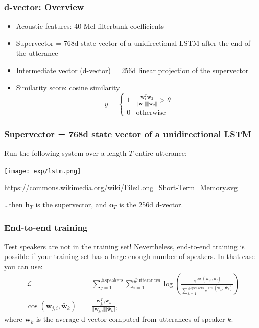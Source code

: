 \documentclass{beamer}
\begin{document}
\begin{frame}
  \frametitle{d-vector: Overview}

  \begin{itemize}
  \item Acoustic features: 40 Mel filterbank coefficients
  \item Supervector = 768d state vector of a unidirectional LSTM after the end of the utterance
  \item Intermediate vector (d-vector) = 256d linear projection of the supervector
  \item Similarity score: cosine similarity
    \begin{displaymath}
      y=\begin{cases}
      1 & \frac{\bm{w}_1^T\bm{w}_2}{\Vert\bm{w}_1\Vert\Vert\bm{w}_2\Vert} >\theta\\
      0 &\mbox{otherwise}
      \end{cases}
    \end{displaymath}
  \end{itemize}
\end{frame}

\begin{frame}
  \frametitle{Supervector = 768d state vector of a unidirectional LSTM}

  Run the following system over a length-$T$ entire utterance:

  \centerline{\texttt{[image: exp/lstm.png]}}
  \centerline{\footnotesize{\url{https://commons.wikimedia.org/wiki/File:Long_Short-Term_Memory.svg}}}

  \vspace*{1mm}
  
  \ldots then $\bm{h}_T$ is the supervector, and $\bm{o}_T$ is the 256d d-vector.
\end{frame}

\begin{frame}
  \frametitle{End-to-end training}

  Test speakers are not in the training set!  Nevertheless, end-to-end
  training is possible if your training set has a large enough number
  of speakers.  In that case you can use:
  \begin{align*}
    \mathcal{L} &= \sum_{j=1}^{\text{\# speakers}}\sum_{i=1}^{\text{\# utterances}}
    \log\left(\frac{e^{\cos(\bm{w}_{j,i},\bar{\bm{w}}_j)}}{\sum_{k=1}^{\text{\# speakers}} e^{\cos(\bm{w}_{j,i},\bar{\bm{w}}_k)}}\right)\\
    \cos(\bm{w}_{j,i},\bar{\bm{w}}_k) &= \frac{\bm{w}_{j,i}^T\bar{\bm{w}}_k}{\Vert\bm{w}_{j,i}\Vert\Vert\bar{\bm{w}}_k\Vert},
  \end{align*}
  where $\bar{\bm{w}}_k$ is the average d-vector computed from utterances of speaker $k$.
\end{frame}
\end{document}
